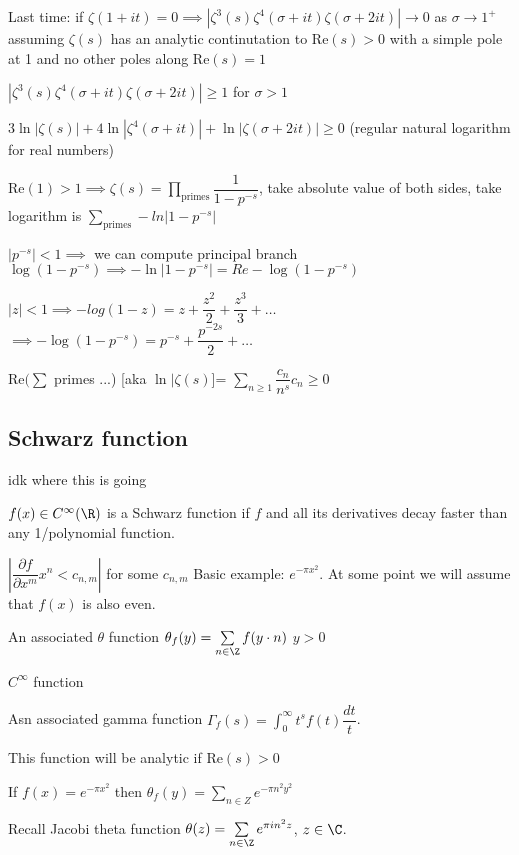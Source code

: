 \documentclass[10pt]{article}
\renewcommand{\Re}{\text{Re}}
\begin{document}
Last time: if $\zeta(1 + it) = 0 \implies |\zeta^3(s)\zeta^4(\sigma + it)\zeta(\sigma + 2it)| \to 0$ as $\sigma \to 1^+$ assuming $\zeta(s)$ has an analytic continutation to $\Re(s) > 0$ with a simple pole at 1 and no other poles along $\Re(s) = 1$

$|\zeta^3(s)\zeta^4(\sigma + it)\zeta(\sigma + 2it)| \geq 1$ for $\sigma > 1$

$3\ln|\zeta(s)| + 4\ln|\zeta^4(\sigma + it)| + \ln|\zeta(\sigma + 2it)| \geq 0$ (regular natural logarithm for real numbers)

$\Re(1) > 1 \implies \zeta(s) = \prod\limits_{\text{primes}} \dfrac{1}{1 - p^{-s}}$, take absolute value of both sides, take logarithm is $\sum\limits_{\text{primes}}-ln|1 - p^{-s}|$

$|p^{-s}| < 1 \implies$ we can compute principal branch $\log(1 - p^{-s}) \implies -\ln|1-p^{-s}| = Re - \log(1 - p^{-s})$

$|z| < 1 \implies -log(1 - z) = z + \dfrac{z^2}{2} + \dfrac{z^3}{3} + \ldots$
$\implies -\log(1 - p^{-s}) = p^{-s} + \dfrac{p^{-2s}}{2} + \ldots$

$\Re(\sum$ primes ...) [aka $\ln|\zeta(s)$]= $\sum\limits_{n \geq 1} \dfrac{c_n}{n^s} c_n \geq 0$

\subsection{Schwarz function} idk where this is going

$f(x) \in C^\infty (\R)$ is a Schwarz function if $f$ and all its derivatives decay faster than any 1/polynomial function.

$| \dfrac{\partial f}{\partial x^m} x^n < c_{n, m}|$ for some $c_{n, m}$ Basic example: $e^{-\pi x^2}$. At some point we will assume that $f(x)$ is also even.

\begin{defn}
   An associated $\theta$ function $\theta_f(y) = \sum\limits_{n \in \Z}f(y \cdot n)$ $y > 0$
\end{defn}
$C^\infty$ function

\begin{defn}
   Asn associated gamma function $\Gamma_f(s) = \int_0^\infty t^s f(t) \dfrac{dt}{t}$.
\end{defn}
This function will be analytic if $\Re(s) > 0$

If $f(x) = e^{-\pi x^2}$ then $\theta_f(y) = \sum\limits_{n \in Z} e^{-\pi n^2 y^2}$

Recall Jacobi theta function $\theta(z) = \sum\limits_{n \in \Z} e^{\pi i n^2 z}$, $z\in \C$.
\end{document}
